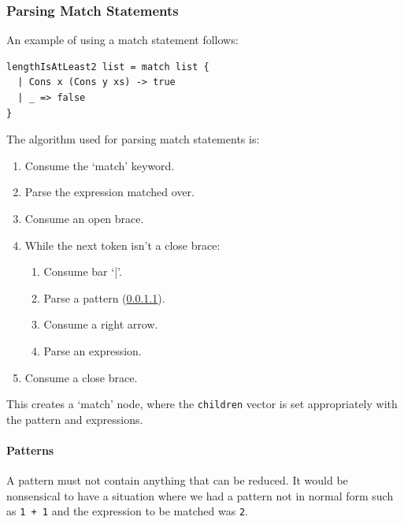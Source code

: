 \subsubsection{Parsing Match Statements}
An example of using a match statement follows:
\begin{lstlisting}[language=SFL]
lengthIsAtLeast2 list = match list {
  | Cons x (Cons y xs) -> true
  | _ => false
}
\end{lstlisting}

The algorithm used for parsing match statements is:
\begin{enumerate}
    \item Consume the `match' keyword.
    \item Parse the expression matched over.
    \item Consume an open brace.
    \item While the next token isn't a close brace: \begin{enumerate}
        \item Consume bar `|'.
        \item Parse a pattern (\ref{impl:parsing_patterns}).
        \item Consume a right arrow.
        \item Parse an expression.
    \end{enumerate}
    \item Consume a close brace.
\end{enumerate}
This creates a `match' node, where the \verb|children| vector is set appropriately with the pattern and expressions.

\paragraph{Patterns}
\label{impl:parsing_patterns}
A pattern must not contain anything that can be reduced. It would be nonsensical to have a situation where we had a pattern not in normal form such as \verb|1 + 1| and the expression to be matched was \verb|2|. 

